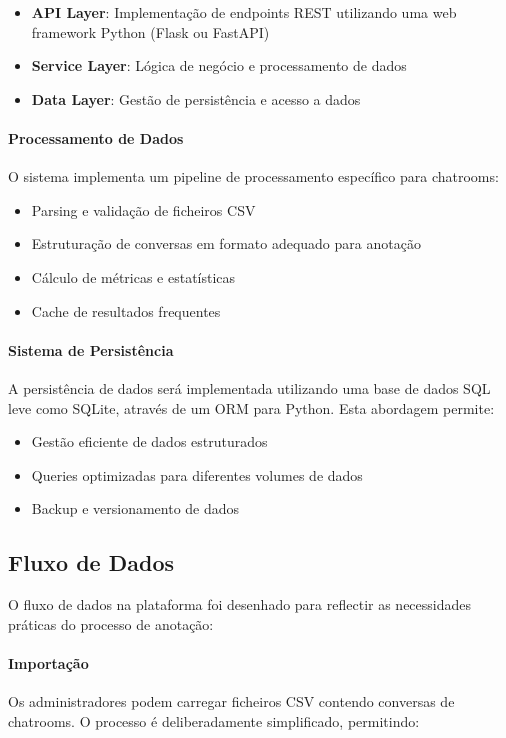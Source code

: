 \begin{itemize}
    \item \textbf{API Layer}: Implementação de endpoints REST utilizando uma web framework Python (Flask ou FastAPI)
    \item \textbf{Service Layer}: Lógica de negócio e processamento de dados
    \item \textbf{Data Layer}: Gestão de persistência e acesso a dados
\end{itemize}

\paragraph{Processamento de Dados}
O sistema implementa um pipeline de processamento específico para chatrooms:

\begin{itemize}
    \item Parsing e validação de ficheiros CSV
    \item Estruturação de conversas em formato adequado para anotação
    \item Cálculo de métricas e estatísticas
    \item Cache de resultados frequentes
\end{itemize}

\paragraph{Sistema de Persistência}
A persistência de dados será implementada utilizando uma base de dados SQL leve como SQLite, através de um ORM para Python. Esta abordagem permite:

\begin{itemize}
    \item Gestão eficiente de dados estruturados
    \item Queries optimizadas para diferentes volumes de dados
    \item Backup e versionamento de dados
\end{itemize}

\subsection{Fluxo de Dados}

O fluxo de dados na plataforma foi desenhado para reflectir as necessidades práticas do processo de anotação:

\paragraph{Importação}
Os administradores podem carregar ficheiros CSV contendo conversas de chatrooms. O processo é deliberadamente simplificado, permitindo:

